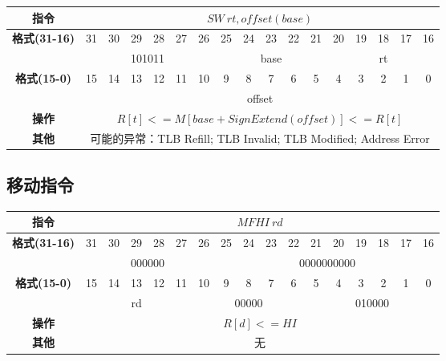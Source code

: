 \documentclass[11pt,utf8]{article}
\begin{document}
\begin{center}
\begin{tabular}{|c|c|c|c|c|c|c|c|c|c|c|c|c|c|c|c|c|}
\hline
\textbf{指令} & \multicolumn{16}{c|}{$SW~rt,offset(base)$} \\
\hline
\multirow{2}{*}{\textbf{格式(31-16)}} & 31 & 30 & 29 & 28 & 27 & 26 & 25 & 24 & 23 & 22 & 21 & 20 & 19 & 18 & 17 & 16 \\ 
\cline{2-17}
& \multicolumn{6}{c|}{101011} & \multicolumn{5}{c|}{base} & \multicolumn{5}{c|}{rt}\\
\hline
\multirow{2}{*}{\textbf{格式(15-0)}} & 15 & 14 & 13 & 12 & 11 & 10 & 9 & 8 & 7 & 6 & 5 & 4 & 3 & 2 & 1 & 0 \\
\cline{2-17}
& \multicolumn{16}{c|}{offset}\\
\hline
\textbf{操作} & \multicolumn{16}{c|}{$R[t]<=M[base+SignExtend(offset)]<=R[t]$} \\
\hline
\textbf{其他} & \multicolumn{16}{c|}{可能的异常：TLB Refill; TLB Invalid; TLB Modified; Address Error} \\
\hline
\end{tabular}
\end{center}

\subsection{移动指令}

\begin{center}
\begin{tabular}{|c|c|c|c|c|c|c|c|c|c|c|c|c|c|c|c|c|}
\hline
\textbf{指令} & \multicolumn{16}{c|}{$MFHI~rd$} \\
\hline
\multirow{2}{*}{\textbf{格式(31-16)}} & 31 & 30 & 29 & 28 & 27 & 26 & 25 & 24 & 23 & 22 & 21 & 20 & 19 & 18 & 17 & 16 \\ 
\cline{2-17}
& \multicolumn{6}{c|}{000000} & \multicolumn{10}{c|}{0000000000} \\
\hline
\multirow{2}{*}{\textbf{格式(15-0)}} & 15 & 14 & 13 & 12 & 11 & 10 & 9 & 8 & 7 & 6 & 5 & 4 & 3 & 2 & 1 & 0 \\
\cline{2-17}
& \multicolumn{5}{c|}{rd}& \multicolumn{5}{c|}{00000}& \multicolumn{6}{c|}{010000}\\
\hline
\textbf{操作} & \multicolumn{16}{c|}{$R[d]<=HI$} \\
\hline
\textbf{其他} & \multicolumn{16}{c|}{无} \\
\hline
\end{tabular}
\end{center}
\end{document}
